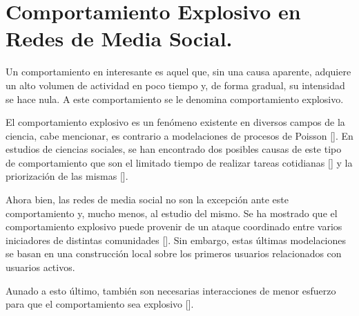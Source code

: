 \documentclass[../main.tex]{subfiles}
\begin{document}
\section{Comportamiento Explosivo en Redes de Media Social.}

Un comportamiento en \RMS interesante es aquel que, sin una causa aparente, adquiere un alto volumen de actividad en poco tiempo y, de forma gradual, su intensidad se hace nula. A este comportamiento se le denomina comportamiento explosivo.  

El comportamiento explosivo es un fenómeno existente en diversos campos de la ciencia, cabe mencionar, es contrario a modelaciones de procesos de Poisson [\cite{Barabsi2005}]. En estudios de ciencias sociales, se han encontrado dos posibles causas de este tipo de comportamiento que son el limitado tiempo de realizar tareas cotidianas [\cite{Miritello2013}] y la priorización de las mismas [\cite{Barabsi2005}]. 


Ahora bien, las redes de media social no son la excepción ante este comportamiento y, mucho menos, al estudio del mismo. Se ha mostrado que el comportamiento explosivo puede provenir de un ataque coordinado entre varios iniciadores de distintas comunidades [\cite{D_weng2014predicting,D_Weng2013, Lerman2016}]. Sin embargo, estas últimas modelaciones se basan en una construcción local sobre los primeros usuarios relacionados con usuarios activos. 

Aunado a esto último, también son necesarias interacciones de menor esfuerzo para que el comportamiento sea explosivo  [\cite{Model_Fabrega_regresion,Model_retweets_inproceedings}]. 






 



\end{document}
